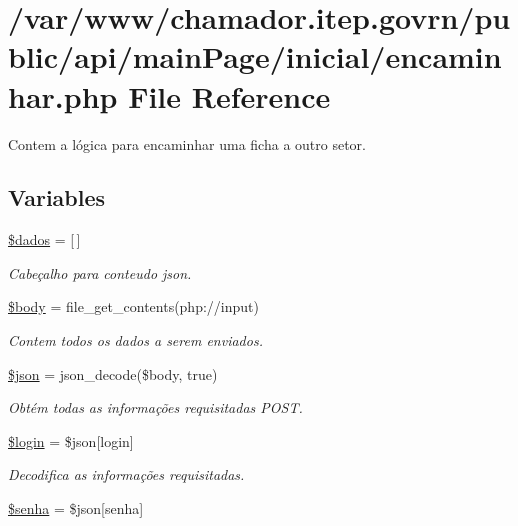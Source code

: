 \hypertarget{encaminhar_8php}{}\section{/var/www/chamador.itep.\+govrn/public/api/main\+Page/inicial/encaminhar.php File Reference}
\label{encaminhar_8php}


Contem a lógica para encaminhar uma ficha a outro setor.  


\subsection*{Variables}
\begin{DoxyCompactItemize}
\item 
\hyperlink{encaminhar_8php_a252370d95039a38fa11afab784725d58}{\$dados} = \mbox{[}$\,$\mbox{]}
\begin{DoxyCompactList}\small\item\em Cabeçalho para conteudo json. \end{DoxyCompactList}\item 
\hyperlink{encaminhar_8php_a26b9f9373f7bb79dfcf8a86dff086b45}{\$body} = file\+\_\+get\+\_\+contents(\textquotesingle{}php\+://input\textquotesingle{})
\begin{DoxyCompactList}\small\item\em Contem todos os dados a serem enviados. \end{DoxyCompactList}\item 
\hyperlink{encaminhar_8php_acedd13b51401130848ce18f4d5c52605}{\$json} = json\+\_\+decode(\$body, true)
\begin{DoxyCompactList}\small\item\em Obtém todas as informações requisitadas P\+O\+ST. \end{DoxyCompactList}\item 
\hyperlink{encaminhar_8php_afc31993e855f9631572adfedcfe6f34b}{\$login} = \$json\mbox{[}\textquotesingle{}login\textquotesingle{}\mbox{]}
\begin{DoxyCompactList}\small\item\em Decodifica as informações requisitadas. \end{DoxyCompactList}\item 
\hyperlink{encaminhar_8php_a3678c8769c9698fd30581c1016c5f475}{\$senha} = \$json\mbox{[}\textquotesingle{}senha\textquotesingle{}\mbox{]}

\end{DoxyCompactItemize}
